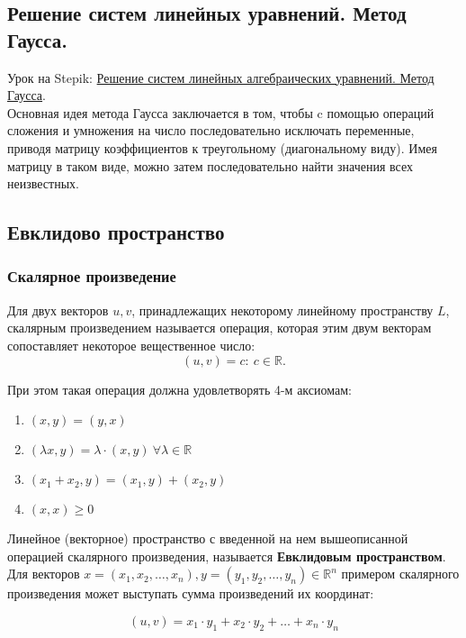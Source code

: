 \documentclass{article}
\begin{document}
\subsection{Решение систем линейных уравнений. Метод Гаусса.}

Урок на Stepik: \href{https://stepik.org/lesson/9582/step/1?unit=23533}{Решение систем линейных алгебраических уравнений. Метод Гаусса}. \\

Основная идея метода Гаусса заключается в том, чтобы c помощью операций сложения и умножения на число последовательно исключать переменные, приводя матрицу коэффициентов к треугольному (диагональному виду). Имея матрицу в таком виде, можно затем последовательно найти значения всех неизвестных.

\subsection{Евклидово пространство}

\subsubsection{Скалярное произведение}

Для двух векторов $u, v$, принадлежащих некоторому линейному пространству $L$, скалярным произведением называется операция, которая этим двум векторам сопоставляет некоторое вещественное число: $$(u, v) = c: \ c \in \mathbb{R}.$$

При этом такая операция должна удовлетворять 4-м аксиомам:

\begin{enumerate}
	\item $(x, y) = (y, x)$
	\item $(\lambda x, y) = \lambda \cdot (x, y) \ \forall \lambda \in \mathbb{R}$
	\item $(x_1 + x_2, y) = (x_1, y) + (x_2, y)$
	\item $(x, x) \ge 0$
\end{enumerate}

Линейное (векторное) пространство с введенной на нем вышеописанной операцией скалярного произведения, называется \textbf{Евклидовым пространством}. \\

Для векторов $x = (x_1, x_2, \dots, x_n), y = (y_1, y_2, \dots, y_n) \in \mathbb{R}^n$ примером скалярного произведения может выступать сумма произведений их координат:

$$ (u, v) = x_1 \cdot y_1 + x_2 \cdot y_2 + \dots + x_n \cdot y_n$$
\end{document}

